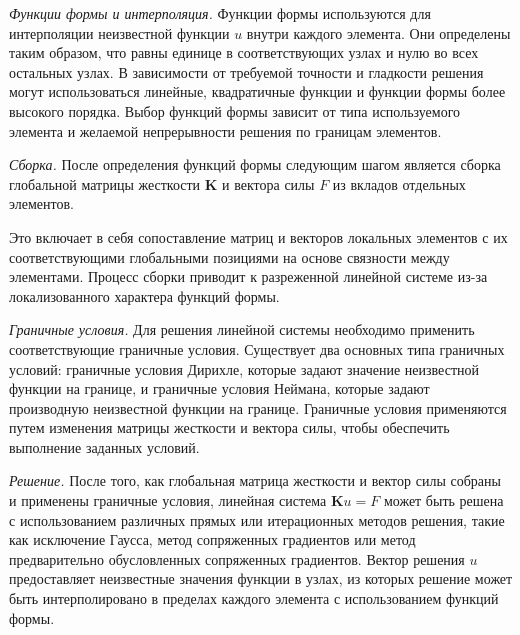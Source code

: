 \textit{Функции формы и интерполяция.}
Функции формы используются для интерполяции неизвестной
функции $u$ внутри каждого элемента.
Они определены таким образом, что равны единице в соответствующих
узлах и нулю во всех остальных узлах.
В зависимости от требуемой
точности и гладкости решения могут использоваться линейные,
квадратичные функции и функции формы более высокого порядка.
Выбор функций формы зависит от типа используемого элемента и желаемой
непрерывности решения по границам элементов.

\textit{Сборка.}
После определения функций формы следующим шагом является сборка
глобальной матрицы жесткости $\mathbf{K}$ и вектора силы $F$
из вкладов отдельных элементов.

Это включает в себя сопоставление матриц и векторов локальных
элементов с их соответствующими глобальными
позициями на основе связности между элементами.
Процесс сборки приводит к разреженной линейной системе
из-за локализованного характера функций формы.

\textit{Граничные условия.}
Для решения линейной системы необходимо
применить соответствующие граничные условия.
Существует два основных типа граничных условий:
граничные условия Дирихле, которые задают значение
неизвестной функции на границе, и граничные условия Неймана,
которые задают производную неизвестной функции на границе.
Граничные условия применяются путем изменения матрицы
жесткости и вектора силы, чтобы обеспечить выполнение заданных условий.

\textit{Решение.}
После того, как глобальная матрица жесткости и вектор силы собраны
и применены граничные условия, линейная система
$\mathbf{K} u = F$ может быть решена с использованием
различных прямых или итерационных методов решения, такие как исключение Гаусса,
метод сопряженных градиентов или метод предварительно обусловленных сопряженных градиентов.
Вектор решения $u$ предоставляет неизвестные значения функции в узлах,
из которых решение может быть интерполировано в пределах
каждого элемента с использованием функций формы.

